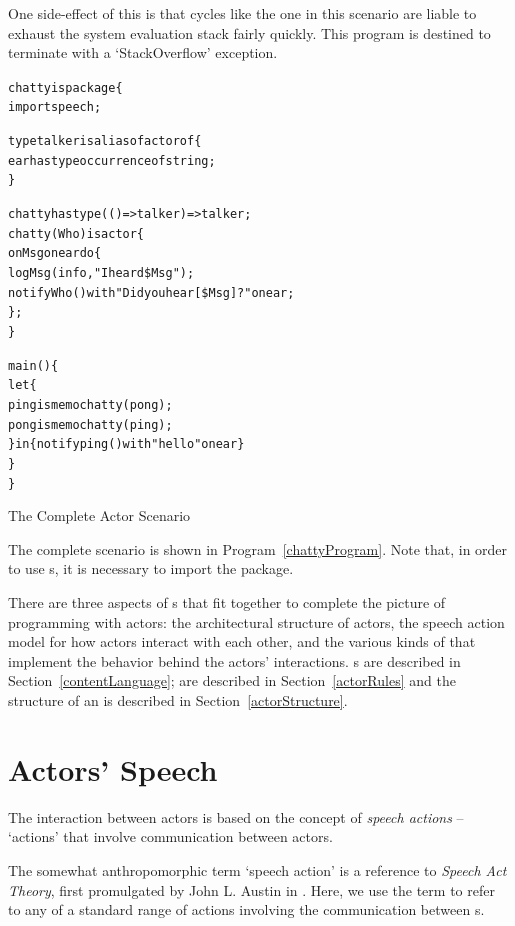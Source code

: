 \begin{aside}
One side-effect of this is that cycles like the one in this scenario are liable to exhaust the system evaluation stack fairly quickly. This program is destined to terminate with a `StackOverflow' exception.
\end{aside}

\begin{program}
\begin{alltt}
chatty is package\{
  import speech;
  
  type talker is alias of actor of \{
    ear has type occurrence of string;
  \}

  chatty has type (()=>talker)=>talker;
  chatty(Who) is actor\{
    on Msg on ear do\{
      logMsg(info,"I heard \$Msg");
      notify Who() with "Did you hear [\$Msg]?" on ear;
    \};
  \}
  
  main()\{
    let\{
      ping is memo chatty(pong);
      pong is memo chatty(ping);
    \} in \{ notify ping() with "hello" on ear \}
  \}
\}
\end{alltt}
\caption{The Complete  Actor Scenario}
\label{chattyProgram}
\end{program}
The complete scenario is shown in Program~\vref{chattyProgram}. Note that, in order to use s, it is necessary to import the  package.

There are three aspects of s that fit together to complete the picture of programming with actors: the architectural structure of actors, the speech action model for how actors interact with each other, and the various kinds of  that implement the behavior behind the actors' interactions. s are described in Section~\vref{contentLanguage};  are described in Section~\vref{actorRules} and the structure of an  is described in Section~\vref{actorStructure}.

\section{Actors' Speech}
\label{contentLanguage}

The interaction between actors is based on the concept of \emph{speech actions} -- `actions' that involve communication between actors.

\begin{aside}
The somewhat anthropomorphic term `speech action' is a reference to \emph{Speech Act Theory}, first promulgated by John L. Austin in \cite{austin:60}. Here, we use the term to refer to any of a standard range of actions involving the communication between s.
\end{aside}

